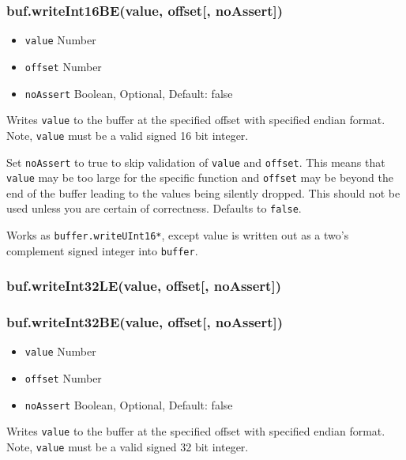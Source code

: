 \subsubsection{buf.writeInt16BE(value, offset{[},
noAssert{]})}\label{buf.writeint16bevalue-offset-noassert}

\begin{itemize}
\itemsep1pt\parskip0pt
\item
  \texttt{value} Number
\item
  \texttt{offset} Number
\item
  \texttt{noAssert} Boolean, Optional, Default: false
\end{itemize}

Writes \texttt{value} to the buffer at the specified offset with
specified endian format. Note, \texttt{value} must be a valid signed 16
bit integer.

Set \texttt{noAssert} to true to skip validation of \texttt{value} and
\texttt{offset}. This means that \texttt{value} may be too large for the
specific function and \texttt{offset} may be beyond the end of the
buffer leading to the values being silently dropped. This should not be
used unless you are certain of correctness. Defaults to \texttt{false}.

Works as \texttt{buffer.writeUInt16*}, except value is written out as a
two's complement signed integer into \texttt{buffer}.

\subsubsection{buf.writeInt32LE(value, offset{[},
noAssert{]})}\label{buf.writeint32levalue-offset-noassert}

\subsubsection{buf.writeInt32BE(value, offset{[},
noAssert{]})}\label{buf.writeint32bevalue-offset-noassert}

\begin{itemize}
\itemsep1pt\parskip0pt
\item
  \texttt{value} Number
\item
  \texttt{offset} Number
\item
  \texttt{noAssert} Boolean, Optional, Default: false
\end{itemize}

Writes \texttt{value} to the buffer at the specified offset with
specified endian format. Note, \texttt{value} must be a valid signed 32
bit integer.

